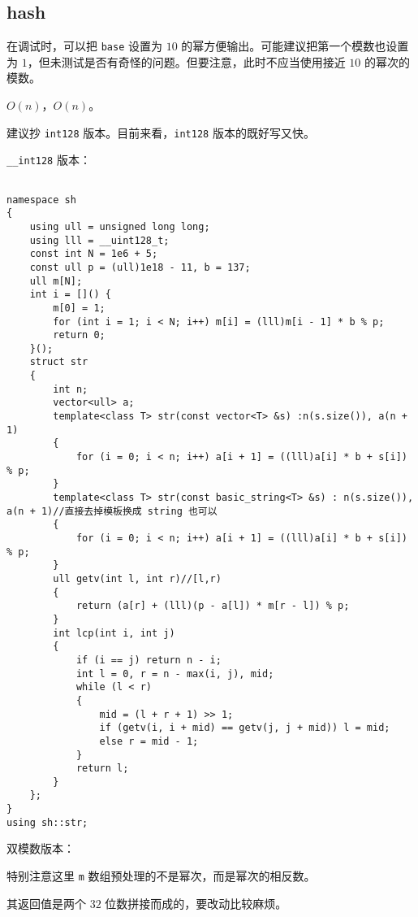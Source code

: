 \documentclass[12pt]{ctexart}
\begin{document}
\subsection{hash}

在调试时，可以把 \verb|base| 设置为 $10$ 的幂方便输出。可能建议把第一个模数也设置为 $1$，但未测试是否有奇怪的问题。但要注意，此时不应当使用接近 $10$ 的幂次的模数。

$O(n)$，$O(n)$。

建议抄 \verb|int128| 版本。目前来看，\verb|int128| 版本的既好写又快。

\verb|__int128| 版本：

\begin{lstlisting}

namespace sh
{
	using ull = unsigned long long;
	using lll = __uint128_t;
	const int N = 1e6 + 5;
	const ull p = (ull)1e18 - 11, b = 137;
	ull m[N];
	int i = []() {
		m[0] = 1;
		for (int i = 1; i < N; i++) m[i] = (lll)m[i - 1] * b % p;
		return 0;
	}();
	struct str
	{
		int n;
		vector<ull> a;
		template<class T> str(const vector<T> &s) :n(s.size()), a(n + 1)
		{
			for (i = 0; i < n; i++) a[i + 1] = ((lll)a[i] * b + s[i]) % p;
		}
		template<class T> str(const basic_string<T> &s) : n(s.size()), a(n + 1)//直接去掉模板换成 string 也可以
		{
			for (i = 0; i < n; i++) a[i + 1] = ((lll)a[i] * b + s[i]) % p;
		}
		ull getv(int l, int r)//[l,r)
		{
			return (a[r] + (lll)(p - a[l]) * m[r - l]) % p;
		}
		int lcp(int i, int j)
		{
			if (i == j) return n - i;
			int l = 0, r = n - max(i, j), mid;
			while (l < r)
			{
				mid = (l + r + 1) >> 1;
				if (getv(i, i + mid) == getv(j, j + mid)) l = mid;
				else r = mid - 1;
			}
			return l;
		}
	};
}
using sh::str;

\end{lstlisting}

双模数版本：

特别注意这里 \verb|m| 数组预处理的不是幂次，而是幂次的相反数。

其返回值是两个 $32$ 位数拼接而成的，要改动比较麻烦。
\end{document}
